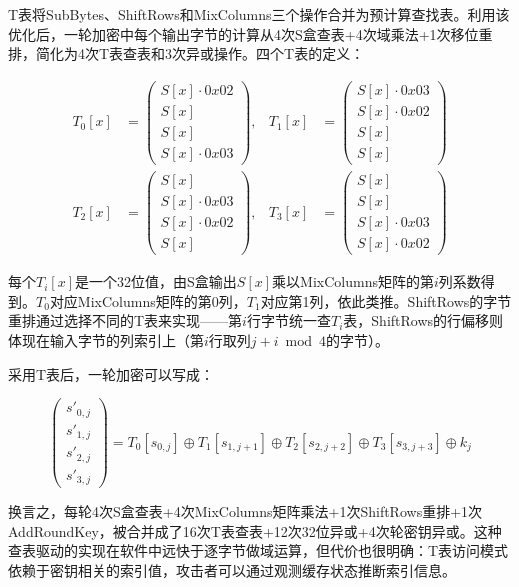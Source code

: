 T表将SubBytes、ShiftRows和MixColumns三个操作合并为预计算查找表。利用该优化后，一轮加密中每个输出字节的计算从4次S盒查表+4次域乘法+1次移位重排，简化为4次T表查表和3次异或操作。四个T表的定义：

\begin{align}
T_0[x] &= \begin{pmatrix} S[x] \cdot 0x02 \\ S[x] \\ S[x] \\ S[x] \cdot 0x03 \end{pmatrix}, & T_1[x] &= \begin{pmatrix} S[x] \cdot 0x03 \\ S[x] \cdot 0x02 \\ S[x] \\ S[x] \end{pmatrix} \\
T_2[x] &= \begin{pmatrix} S[x] \\ S[x] \cdot 0x03 \\ S[x] \cdot 0x02 \\ S[x] \end{pmatrix}, & T_3[x] &= \begin{pmatrix} S[x] \\ S[x] \\ S[x] \cdot 0x03 \\ S[x] \cdot 0x02 \end{pmatrix}
\end{align}

每个$T_i[x]$是一个32位值，由S盒输出$S[x]$乘以MixColumns矩阵的第$i$列系数得到。$T_0$对应MixColumns矩阵的第0列，$T_1$对应第1列，依此类推。ShiftRows的字节重排通过选择不同的T表来实现——第$i$行字节统一查$T_i$表，ShiftRows的行偏移则体现在输入字节的列索引上（第$i$行取列$j+i \bmod 4$的字节）。

采用T表后，一轮加密可以写成：

\begin{equation}
\begin{pmatrix} s'_{0,j} \\ s'_{1,j} \\ s'_{2,j} \\ s'_{3,j} \end{pmatrix} = T_0[s_{0,j}] \oplus T_1[s_{1,j+1}] \oplus T_2[s_{2,j+2}] \oplus T_3[s_{3,j+3}] \oplus k_j
\end{equation}

换言之，每轮4次S盒查表+4次MixColumns矩阵乘法+1次ShiftRows重排+1次AddRoundKey，被合并成了16次T表查表+12次32位异或+4次轮密钥异或。这种查表驱动的实现在软件中远快于逐字节做域运算，但代价也很明确：T表访问模式依赖于密钥相关的索引值，攻击者可以通过观测缓存状态推断索引信息。

